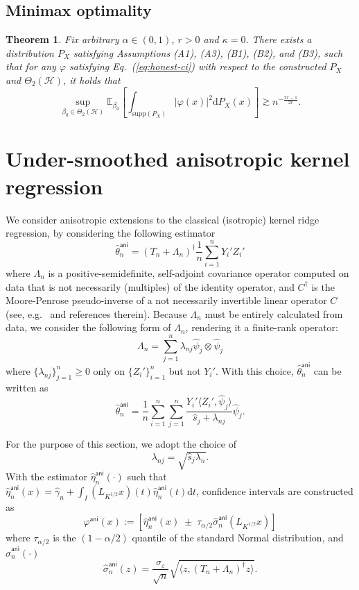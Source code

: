 \documentclass[11pt,a4paper]{article}
\renewcommand{\hat}{\widehat}
\theoremstyle{definition}
\theoremstyle{plain}
\newtheorem{theorem}{Theorem}[section]
\theoremstyle{remark}
\newcommand{\supp}{\mathrm{supp}}
\newcommand{\ud}{\mathrm d}
\newcommand{\mH}{\mathcal H}
\newcommand{\ani}{\mathsf{ani}}
\begin{document}
\subsection{Minimax optimality}

\begin{theorem}
Fix arbitrary $\alpha\in(0,1)$, $r>0$ and $\kappa=0$. There exists a distribution $P_X$ satisfying Assumptions (A1), (A3), (B1), (B2), and (B3), such that for any $\varphi$ satisfying Eq.~(\ref{eq:honest-ci})
with respect to the constructed $P_X$ and $\Theta_2(\mH)$, it holds that
$$
\sup_{\beta_0\in\Theta_2(\mH)} \mathbb E_{\beta_0}\left[\int_{\supp(P_X)}\big|\varphi(x)\big|^2\ud P_X(x)\right] \gtrsim n^{-\frac{2r-1}{2r}}.
$$
\label{thm:isokrr-lb}
\end{theorem}

\section{Under-smoothed anisotropic kernel regression}

We consider anisotropic extensions to the classical (isotropic) kernel ridge regression, by considering the following estimator
$$
\hat\theta_n^\ani = (T_n+\Lambda_n)^{\dagger}\frac{1}{n}\sum_{i=1}^n Y_i' Z_i'
$$
where $\Lambda_n$ is a positive-semidefinite, self-adjoint covariance operator computed on data that is not necessarily (multiples) of the identity operator,
and $C^\dagger$ is the Moore-Penrose pseudo-inverse of a not necessarily invertible linear operator $C$ (see, e.g.~\citep{fongi2023moore} and references therein).
Because $\Lambda_n$ must be entirely calculated from data, we consider the following form of $\Lambda_n$, rendering it a finite-rank operator:
$$
\Lambda_n = \sum_{j=1}^n \lambda_{nj}\hat\psi_j\otimes\hat\psi_j
$$
where $\{\lambda_{nj}\}_{j=1}^n\geq 0$ only on $\{Z_i'\}_{i=1}^n$ but not $Y_i'$.
With this choice, $\hat\theta_n^\ani$ can be written as
$$
\hat\theta_n^\ani = \frac{1}{n}\sum_{i=1}^n\sum_{j=1}^n \frac{Y_i'\langle Z_i',\hat\psi_j\rangle}{\hat s_j+\lambda_{nj}}\hat\psi_j.
$$

For the purpose of this section, we adopt the choice of 
$$
\lambda_{nj} = \sqrt{\hat s_j\lambda_n}.
$$
With the estimator $\hat\eta^\ani_n(\cdot)$ such that $\hat\eta^\ani_n(x)=\hat\gamma_n+\int_I (L_{K^{1/2}}x)(t)\hat\eta^\ani_n(t)\ud t$, confidence intervals are constructed as
$$
\varphi^\ani(x) := [\hat\eta^\ani_n(x)\;\pm\;\tau_{\alpha/2}\hat\sigma_n^\ani(L_{K^{1/2}}x)]
$$
where $\tau_{\alpha/2}$ is the $(1-\alpha/2)$ quantile of the standard Normal distribution, and $\hat\sigma_n^\ani(\cdot)$ 
$$
\hat\sigma_n^\ani(z) = \frac{\sigma_\varepsilon}{\sqrt{n}}\sqrt{\langle z, (T_n+\Lambda_n)^{\dagger}z\rangle}.
$$
\end{document}
